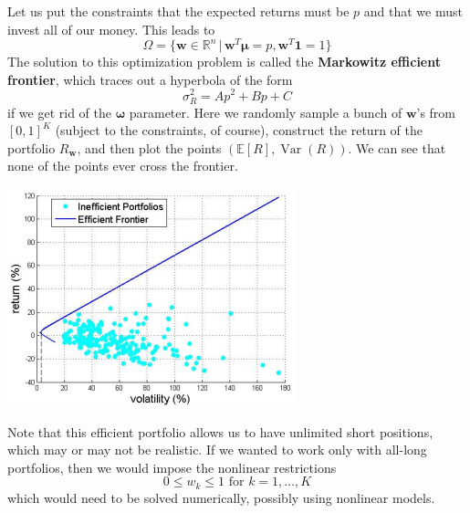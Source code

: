 \documentclass{article}
\DeclareMathOperator{\Var}{Var}
\begin{document}
    \begin{example}
      Let us put the constraints that the expected returns must be $p$ and that we must invest all of our money. This leads to 
      \begin{equation}
        \Omega = \{ \mathbf{w} \in \mathbb{R}^n \, | \, \mathbf{w}^T \boldsymbol{\mu} = p, \mathbf{w}^T \mathbf{1} = 1 \}
      \end{equation}
      The solution to this optimization problem is called the \textbf{Markowitz efficient frontier}, which traces out a hyperbola of the form 
      \begin{equation}
        \sigma^2_R = A p^2 + B p + C
      \end{equation}
      if we get rid of the $\boldsymbol{\omega}$ parameter. Here we randomly sample a bunch of $\mathbf{w}$'s from $[0, 1]^K$ (subject to the constraints, of course), construct the return of the portfolio $R_{\mathbf{w}}$, and then plot the points $(\mathbb{E}[R], \Var(R))$. We can see that none of the points ever cross the frontier. 
      \begin{center}
        \includegraphics[scale=0.65]{img/Efficient_Frontier.png}
      \end{center}
    \end{example}

    \begin{example}
      Note that this efficient portfolio allows us to have unlimited short positions, which may or may not be realistic. If we wanted to work only with all-long portfolios, then we would impose the nonlinear restrictions 
      \begin{equation}
        0 \leq w_k \leq 1 \text{ for } k = 1, \ldots, K
      \end{equation}
      which would need to be solved numerically, possibly using nonlinear models. 
    \end{example}
\end{document}
